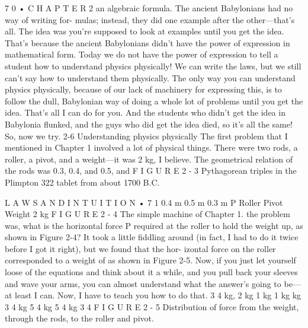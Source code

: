 \documentclass[10pt,oneside]{article}
\begin{document}
7 0 • C H A P T E R  2 an algebraic formula. The ancient Babylonians had no way of writing for- mulas; instead, they did one example after the other---that’s all. The idea was you’re supposed to look at examples until you get the idea. That’s because the ancient Babylonians didn’t have the power of expression in mathematical form. Today we do not have the power of expression to tell a student how to understand physics physically! We can write the laws, but we still can’t say how to understand them physically. The only way you can understand physics physically, because of our lack of machinery for expressing this, is to follow the dull, Babylonian way of doing a whole lot of problems until you get the idea. That’s all I can do for you. And the students who didn’t get the idea in Babylonia flunked, and the guys who did get the idea died, so it’s all the same! So, now we try. 2-6 Understanding physics physically The first problem that I mentioned in Chapter 1 involved a lot of physical things. There were two rods, a roller, a pivot, and a weight---it was 2 kg, I believe. The geometrical relation of the rods was 0.3, 0.4, and 0.5, and F I G U R E  2 - 3 Pythagorean triples in the Plimpton 322 tablet from about 1700 B.C.\par

L A W S  A N D  I N T U I T I O N • 7 1 0.4 m 0.5 m 0.3 m P Roller Pivot Weight 2 kg F I G U R E  2 - 4 The simple machine of Chapter 1. the problem was, what is the horizontal force P required at the roller to hold the weight up, as shown in Figure 2-4? It took a little fiddling around (in fact, I had to do it twice before I got it right), but we found that the hor- izontal force on the roller corresponded to a weight of as shown in Figure 2-5. Now, if you just let yourself loose of the equations and think about it a while, and you pull back your sleeves and wave your arms, you can almost understand what the answer’s going to be---at least I can. Now, I have to teach you how to do that. 3 4 kg, 2 kg 1 kg 1 kg kg 3 4 kg 5 4 kg 5 4 kg 3 4 F I G U R E  2 - 5 Distribution of force from the weight, through the rods, to the roller and pivot.\par
\end{document}
